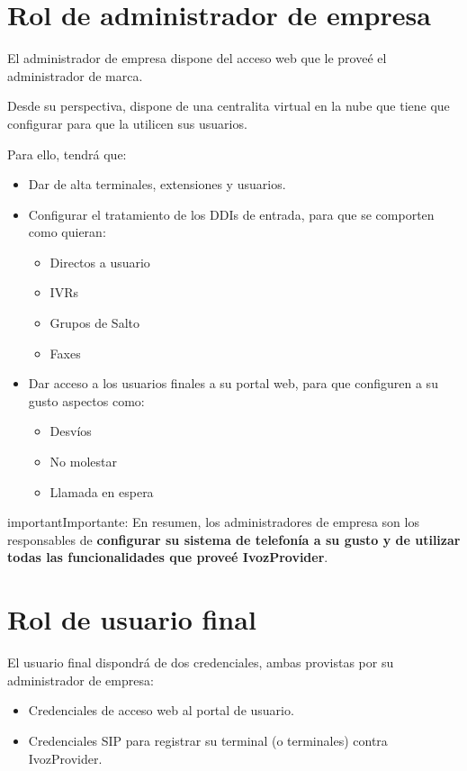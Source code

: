 \documentclass[letterpaper,10pt,spanish]{sphinxmanual}
\begin{document}
\section{Rol de administrador de empresa}
\label{operation_roles/index:company-administator-role}
El administrador de empresa dispone del acceso web que le proveé el administrador de marca.

Desde su perspectiva, dispone de una centralita virtual en la nube que tiene que configurar para que la utilicen sus usuarios.

Para ello, tendrá que:
\begin{itemize}
\item {} 
Dar de alta terminales, extensiones y usuarios.

\item {} 
Configurar el tratamiento de los DDIs de entrada, para que se comporten como quieran:
\begin{itemize}
\item {} 
Directos a usuario

\item {} 
IVRs

\item {} 
Grupos de Salto

\item {} 
Faxes

\end{itemize}

\item {} 
Dar acceso a los usuarios finales a su portal web, para que configuren a su gusto aspectos como:
\begin{itemize}
\item {} 
Desvíos

\item {} 
No molestar

\item {} 
Llamada en espera

\end{itemize}

\end{itemize}

\begin{notice}{important}{Importante:}
En resumen, los administradores de empresa son los responsables de \textbf{configurar su sistema de telefonía a su gusto y de utilizar todas las funcionalidades que proveé IvozProvider}.
\end{notice}


\section{Rol de usuario final}
\label{operation_roles/index:final-user-role}
El usuario final dispondrá de dos credenciales, ambas provistas por su administrador de empresa:
\begin{itemize}
\item {} 
Credenciales de acceso web al portal de usuario.

\item {} 
Credenciales SIP para registrar su terminal (o terminales) contra IvozProvider.

\end{itemize}
\end{document}
